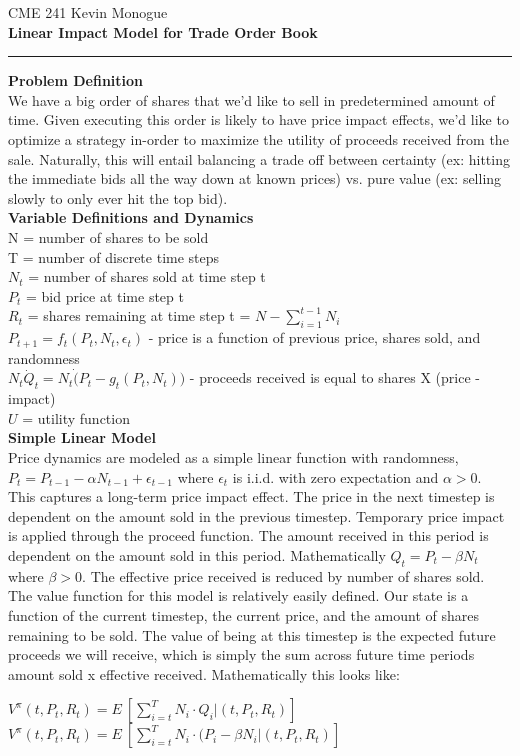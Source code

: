 \documentclass{article}
\newcommand{\MyName}{Kevin Monogue}
\newcommand{\PrintFirstHeader}{
  CME 241 \vspace{5pt} \hfill {\Large{\MyName}}
  \\
  {\LARGE{\textbf{Linear Impact Model for Trade Order Book}}} 

  \rule{\textwidth}{0.4pt}}
\begin{document}
\thispagestyle{firstpage}
\PrintFirstHeader{}

\textbf{Problem Definition}\\
We have a big order of shares that we'd like to sell in predetermined amount of time. Given executing this order is likely to have price impact effects, we'd like to optimize a strategy in-order to maximize the utility of proceeds received from the sale. Naturally, this will entail balancing a trade off between certainty (ex: hitting the immediate bids all the way down at known prices) vs. pure value (ex: selling slowly to only ever hit the top bid). \\

\textbf{Variable Definitions and Dynamics} \\
N = number of shares to be sold \\
T = number of discrete time steps \\
$N_t$ = number of shares sold at time step t \\
$P_t$ = bid price at time step t \\
$R_t$ = shares remaining at time step t = $N - \sum_{i = 1}^{t-1} N_i$ \\
$P_{t+1} = f_t(P_t, N_t, \epsilon_t)$ - price is a function of previous price, shares sold, and randomness \\
$N_t \dot Q_t = N_t \dot (P_t - g_t(P_t, N_t))$ - proceeds received is equal to shares X (price - impact) \\
$U$ = utility function \\

\textbf{Simple Linear Model} \\
Price dynamics are modeled as a simple linear function with randomness, $P_t = P_{t-1} - \alpha N_{t-1} + \epsilon_{t-1}$ where $\epsilon_t$ is i.i.d. with zero expectation and $\alpha > 0$. This captures a long-term price impact effect. The price in the next timestep is dependent on the amount sold in the previous timestep.
Temporary price impact is applied through the proceed function. The amount received in this period is dependent on the amount sold in this period. Mathematically $Q_t = P_t - \beta N_t$ where $\beta > 0$. The effective price received is reduced by number of shares sold. \\

The value function for this model is relatively easily defined. Our state is a function of the current timestep, the current price, and the amount of shares remaining to be sold. The value of being at this timestep is the expected future proceeds we will receive, which is simply the sum across future time periods amount sold x effective received. Mathematically this looks like:
\begin{center}
$V^\pi(t, P_t, R_t) = E~[\sum_{i = t}^{T} N_i \cdot Q_i | (t, P_t, R_t)]  $ \\
$V^\pi(t, P_t, R_t) = E~[\sum_{i = t}^{T} N_i \cdot (P_i - \beta N_i | (t, P_t, R_t)]  $ 
\end{center}
\end{document}

